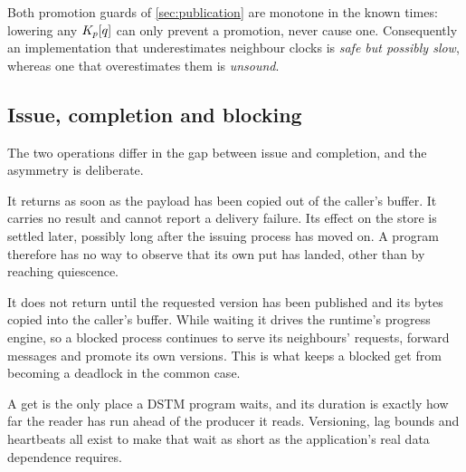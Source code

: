 \begin{proposition}\label{prop:conservative}
Both promotion guards of \cref{sec:publication} are monotone in the known
times: lowering any $K_{p}[q]$ can only prevent a promotion, never cause one.
Consequently an implementation that underestimates neighbour clocks is
\emph{safe but possibly slow}, whereas one that overestimates them is
\emph{unsound}.
\end{proposition}

\subsection{Issue, completion and blocking}
\label{sec:exec-blocking}

The two \glspl{operation} differ in the gap between \gls{issue} and
\gls{completion}, and the asymmetry is deliberate.

\begin{description}[leftmargin=0.9cm,style=nextline,font=\normalfont\bfseries]
\item[A put is asynchronous.]
  It returns as soon as the payload has been copied out of the caller's
  buffer. It carries no result and cannot report a delivery failure. Its
  effect on the store is settled later, possibly long after the issuing process
  has moved on. A program therefore has no way to observe that its own put has
  landed, other than by reaching \gls{quiescence}.

\item[A get is synchronous.]
  It does not return until the requested version has been published and its
  bytes copied into the caller's buffer. While waiting it drives the runtime's
  progress engine, so a blocked process continues to serve its neighbours'
  requests, forward messages and promote its own versions. This is what keeps
  a blocked get from becoming a deadlock in the common case.
\end{description}

\begin{remark}
A get is the only place a DSTM program waits, and its duration is exactly how
far the reader has run ahead of the producer it reads. Versioning, lag
bounds and \glspl{heartbeat} all exist to make that wait as short as the
application's real data dependence requires.
\end{remark}

